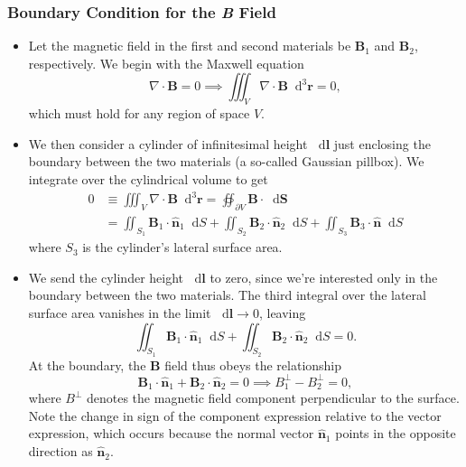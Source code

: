 \documentclass[11pt, a4paper]{article}
\newcommand{\diff}{\mathop{}\!\mathrm{d}} %
\newcommand{\dr}{\diff^{3} \r}  %
\renewcommand{\vec}[1]{\bm{#1}} %
\newcommand{\uvec}[1]{\hat{\vec{#1}}} %
\renewcommand{\r}{\vec{r}}
\newcommand{\B}{\vec{B}} %
\renewcommand{\div}{\nabla \cdot}
\begin{document}
\subsubsection{Boundary Condition for the \textit{B} Field}
\begin{itemize}
	\item Let the magnetic field in the first and second materials be $ \B_{1} $ and $ \B_{2} $, respectively. We begin with the Maxwell equation
	\begin{equation*}
        \div \B = 0 \implies \iiint_{V} \div \B \dr = 0,
	\end{equation*}
	which must hold for any region of space $ V $. 
	
	
    \item We then consider a cylinder of infinitesimal height $ \diff \vec{l} $ just enclosing the boundary between the two materials (a so-called Gaussian pillbox). We integrate over the cylindrical volume to get
	\begin{align*}
        0 & \equiv \iiint_{V} \div \B \dr = \oiint_{\partial V} \B \cdot \diff \vec{S}  \\
        & = \iint_{S_{1}}\B_{1}\cdot \uvec{n}_{1}\diff S + \iint_{S_{2}}\B_{2}\cdot \uvec{n}_{2}\diff S + \iint_{S_{3}}\B_{3}\cdot \uvec{n}\diff S
	\end{align*}
	where $ S_{3} $ is the cylinder's lateral surface area. 

    \item We send the cylinder height $ \diff \vec{l} $ to zero, since we're interested only in the boundary between the two materials. The third integral over the lateral surface area vanishes in the limit $ \diff \vec{l} \to 0 $, leaving
	\begin{equation*}
		\iint_{S_{1}}\B_{1}\cdot \uvec{n}_{1}\diff S + \iint_{S_{2}}\B_{2}\cdot \uvec{n}_{2}\diff S = 0.
	\end{equation*}
    At the boundary, the $ \B $ field thus obeys the relationship
	\begin{equation*}
        \B_{1} \cdot \uvec{n}_{1} + \B_{2} \cdot \uvec{n}_{2} = 0 \implies B_{1}^{\perp} - B_{2}^{\perp} = 0,
	\end{equation*}
    where $ B^{\perp} $ denotes the magnetic field component perpendicular to the surface. Note the change in sign of the component expression relative to the vector expression, which occurs because the normal vector $ \uvec{n}_{1} $ points in the opposite direction as $ \uvec{n}_{2} $.
	
	
\end{itemize}
\end{document}
